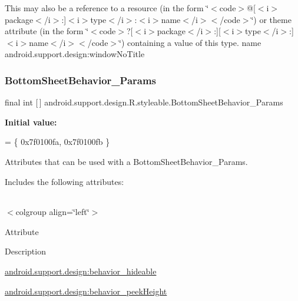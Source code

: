 This may also be a reference to a resource (in the form \char`\"{}$<$code$>$@\mbox{[}$<$i$>$package$<$/i$>$\+:\mbox{]}$<$i$>$type$<$/i$>$\+:$<$i$>$name$<$/i$>$$<$/code$>$\char`\"{}) or theme attribute (in the form \char`\"{}$<$code$>$?\mbox{[}$<$i$>$package$<$/i$>$\+:\mbox{]}\mbox{[}$<$i$>$type$<$/i$>$\+:\mbox{]}$<$i$>$name$<$/i$>$$<$/code$>$\char`\"{}) containing a value of this type.  name android.\+support.\+design\+:window\+No\+Title \mbox{\label{classandroid_1_1support_1_1design_1_1R_1_1styleable_a1eaee76086f549bf3ccdc756b449ddd4}} 
\subsubsection{\texorpdfstring{Bottom\+Sheet\+Behavior\+\_\+\+Params}{BottomSheetBehavior\_Params}}
{\footnotesize\ttfamily final int \mbox{[}$\,$\mbox{]} android.\+support.\+design.\+R.\+styleable.\+Bottom\+Sheet\+Behavior\+\_\+\+Params\hspace{0.3cm}{\ttfamily [static]}}

{\bfseries Initial value\+:}
\begin{DoxyCode}
= \{
            0x7f0100fa, 0x7f0100fb
        \}
\end{DoxyCode}
Attributes that can be used with a Bottom\+Sheet\+Behavior\+\_\+\+Params. 

Includes the following attributes\+:

\tabulinesep=1mm
\begin{longtabu} spread 0pt [c]{*{0}{|X[-1]}|}
\hline
\end{longtabu}
$<$colgroup align=\char`\"{}left\char`\"{}$>$ 

Attribute

Description 

{\ttfamily \hyperlink{classandroid_1_1support_1_1design_1_1R_1_1styleable_a187697693b30aa7a837dcfc348a3e86f}{android.\+support.\+design\+:behavior\+\_\+hideable}}

{\ttfamily \hyperlink{classandroid_1_1support_1_1design_1_1R_1_1styleable_a32c296d23574cb4ecb2698c4645bbbd9}{android.\+support.\+design\+:behavior\+\_\+peek\+Height}}

